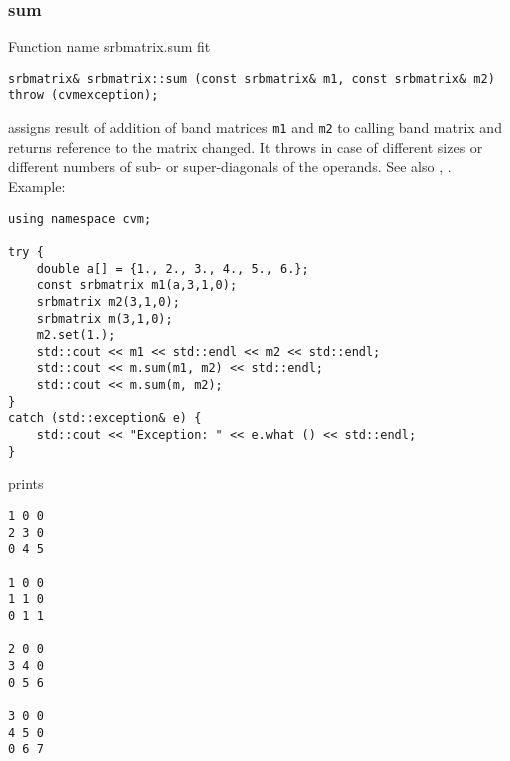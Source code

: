 \subsubsection{sum}
Function%
\pdfdest name {srbmatrix.sum} fit
\begin{verbatim}
srbmatrix& srbmatrix::sum (const srbmatrix& m1, const srbmatrix& m2)
throw (cvmexception);
\end{verbatim}
assigns  result of addition of
band matrices \verb"m1" and \verb"m2"  to  calling band matrix
and returns  reference to
the matrix changed.
It throws  
in case of different sizes or different numbers of sub- or super-diagonals
of the operands.
See also ,
.
Example:
\begin{Verbatim}
using namespace cvm;

try {
    double a[] = {1., 2., 3., 4., 5., 6.};
    const srbmatrix m1(a,3,1,0);
    srbmatrix m2(3,1,0);
    srbmatrix m(3,1,0);
    m2.set(1.);
    std::cout << m1 << std::endl << m2 << std::endl;
    std::cout << m.sum(m1, m2) << std::endl;
    std::cout << m.sum(m, m2);
}
catch (std::exception& e) {
    std::cout << "Exception: " << e.what () << std::endl;
}
\end{Verbatim}
prints
\begin{Verbatim}
1 0 0
2 3 0
0 4 5

1 0 0
1 1 0
0 1 1

2 0 0
3 4 0
0 5 6

3 0 0
4 5 0
0 6 7
\end{Verbatim}
\newpage






